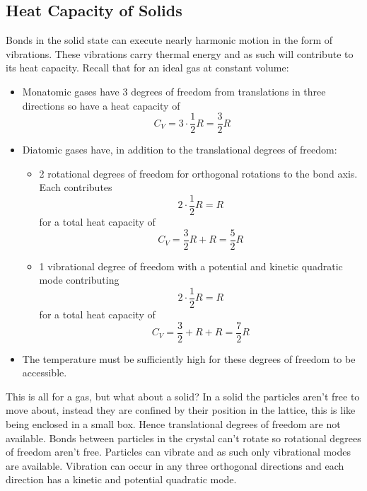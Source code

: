     \subsection{Heat Capacity of Solids}
    Bonds in the solid state can execute nearly harmonic motion in the form of vibrations.
    These vibrations carry thermal energy and as such will contribute to its heat capacity.
    Recall that for an ideal gas at constant volume:
    \begin{itemize}
        \item Monatomic gases have 3 degrees of freedom from translations in three directions so have a heat capacity of
        \[C_V = 3\cdot\frac{1}{2}R = \frac{3}{2}R\]
        \item Diatomic gases have, in addition to the translational degrees of freedom:
        \begin{itemize}
            \item 2 rotational degrees of freedom for orthogonal rotations to the bond axis. Each contributes
            \[2\cdot\frac{1}{2}R = R\]
            for a total heat capacity of
            \[C_V = \frac{3}{2}R + R = \frac{5}{2}R\]
            \item 1 vibrational degree of freedom with a potential and kinetic quadratic mode contributing
            \[2\cdot\frac{1}{2}R =R\]
            for a total heat capacity of
            \[C_V = \frac{3}{2} + R + R = \frac{7}{2}R\]
        \end{itemize}
        \item The temperature must be sufficiently high for these degrees of freedom to be accessible.
    \end{itemize}
    This is all for a gas, but what about a solid?
    In a solid the particles aren't free to move about, instead they are confined by their position in the lattice, this is like being enclosed in a small box.
    Hence translational degrees of freedom are not available.
    Bonds between particles in the crystal can't rotate so rotational degrees of freedom aren't free.
    Particles can vibrate and as such only vibrational modes are available.
    Vibration can occur in any three orthogonal directions and each direction has a kinetic and potential quadratic mode.
    
